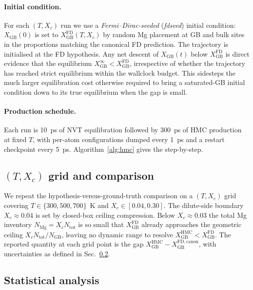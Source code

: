 \paragraph*{Initial condition.}
For each $(T, X_c)$ run we use a \emph{Fermi--Dirac-seeded} (\emph{fdseed})
initial condition: $X_\mathrm{GB}(0)$ is set to
$X_\mathrm{GB}^\mathrm{FD}(T, X_c)$ by random Mg placement at GB and
bulk sites in the proportions matching the canonical FD prediction.
The trajectory is initialised at the FD hypothesis. Any net descent
of $X_\mathrm{GB}(t)$ below $X_\mathrm{GB}^\mathrm{FD}$ is direct
evidence that the equilibrium $X_\mathrm{GB}^{\infty} <
X_\mathrm{GB}^\mathrm{FD}$, irrespective of whether the trajectory has
reached strict equilibrium within the wallclock budget. This sidesteps
the much larger equilibration cost otherwise required to bring a
saturated-GB initial condition down to its true equilibrium when the
gap is small.

\paragraph*{Production schedule.}
Each run is 10~ps of NVT equilibration followed by 300~ps of HMC
production at fixed $T$, with per-atom configurations dumped every
1~ps and a restart checkpoint every 5~ps. Algorithm~\ref{alg:hmc}
gives the step-by-step.


\subsection{$(T, X_c)$ grid and comparison}\label{sec:meth:grid}

We repeat the hypothesis-versus-ground-truth comparison on a $(T, X_c)$
grid covering $T \in \{300, 500, 700\}$~K and $X_c \in [0.04, 0.30]$.
The dilute-side boundary $X_c \approx 0.04$ is set by closed-box
ceiling compression. Below $X_c \approx 0.03$ the total Mg inventory
$N_\mathrm{Mg} = X_c N_\mathrm{tot}$ is so small that
$X_\mathrm{GB}^\mathrm{FD}$ already approaches the geometric ceiling
$X_c N_\mathrm{tot}/N_\mathrm{GB}$, leaving no dynamic range to
resolve $X_\mathrm{GB}^\mathrm{HMC} < X_\mathrm{GB}^\mathrm{FD}$. The
reported quantity at each grid point is the gap
$X_\mathrm{GB}^\mathrm{HMC} - X_\mathrm{GB}^\mathrm{FD,canon}$, with
uncertainties as defined in Sec.~\ref{sec:meth:stats}.


\subsection{Statistical analysis}\label{sec:meth:stats}

